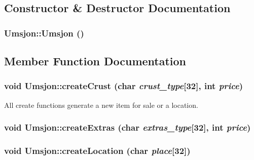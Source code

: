 \subsection{Constructor \& Destructor Documentation}
\hypertarget{class_umsjon_1f89bef332176cd139fa5f900d4735b6}{
\subsubsection[Umsjon]{\setlength{\rightskip}{0pt plus 5cm}Umsjon::Umsjon ()}}
\label{class_umsjon_1f89bef332176cd139fa5f900d4735b6}




\subsection{Member Function Documentation}
\hypertarget{class_umsjon_75c9c243db5456ca368b8cdc6f617603}{
\subsubsection[createCrust]{\setlength{\rightskip}{0pt plus 5cm}void Umsjon::create\-Crust (char {\em crust\_\-type}\mbox{[}32\mbox{]}, int {\em price})}}
\label{class_umsjon_75c9c243db5456ca368b8cdc6f617603}


All create functions generate a new item for sale or a location. 

\hypertarget{class_umsjon_b3b4384d1b6159cee7aab19dc1ff23eb}{
\subsubsection[createExtras]{\setlength{\rightskip}{0pt plus 5cm}void Umsjon::create\-Extras (char {\em extras\_\-type}\mbox{[}32\mbox{]}, int {\em price})}}
\label{class_umsjon_b3b4384d1b6159cee7aab19dc1ff23eb}


\hypertarget{class_umsjon_6827be731c8d50370297264676be442f}{
\subsubsection[createLocation]{\setlength{\rightskip}{0pt plus 5cm}void Umsjon::create\-Location (char {\em place}\mbox{[}32\mbox{]})}}
\label{class_umsjon_6827be731c8d50370297264676be442f}


